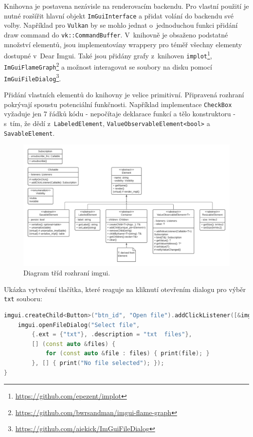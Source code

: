 Knihovna je postavena nezávisle na renderovacím backendu. Pro vlastní použití je nutné rozšířit hlavní objekt \texttt{ImGuiInterface} a přidat volání do backendu své volby. Například pro \texttt{Vulkan} by se mohlo jednat o~jednoduchou funkci přidání draw command do \texttt{vk::CommandBuffer}. V~knihovně je obsaženo podstatné množství elementů, jsou implementovány wrappery pro téměř všechny elementy dostupné v~Dear Imgui. Také jsou přidány grafy z~knihoven \texttt{implot}\footnote{\url{https://github.com/epezent/implot}}, \texttt{ImGuiFlameGraph}\footnote{\url{https://github.com/bwrsandman/imgui-flame-graph}} a možnost interagovat se soubory na disku pomocí \texttt{ImGuiFileDialog}\footnote{\url{https://github.com/aiekick/ImGuiFileDialog}}.

Přidání vlastních elementů do knihovny je velice primitivní. Připravená rozhraní pokrývají spoustu potenciální funkčnosti. Například implementace \texttt{CheckBox} vyžaduje jen 7 řádků kódu - nepočítaje deklarace funkcí a tělo konstruktoru - s~tím, že dědí z~\texttt{LabeledElement}, \texttt{ValueObservableElement<bool>} a \texttt{SavableElement}.

\begin{figure}[H]
	\centering
	\includegraphics[scale=0.5]{obrazky-figures/pfimgui_classes.pdf}
	\caption{Diagram tříd rozhraní imgui.}
	\label{fig:imgui_classes}
\end{figure}


Ukázka vytvoření tlačítka, které reaguje na kliknutí otevřením dialogu pro výběr \texttt{txt} souboru:

\begin{lstlisting}[language=C++, caption={Tvorba logického zařízení}]
imgui.createChild<Button>("btn_id", "Open file").addClickListener([&imgui] {
    imgui.openFileDialog("Select file", 
        {.ext = {"txt"}, .description = "txt  files"}, 
        [] (const auto &files) {
            for (const auto &file : files) { print(file); }
        }, [] { print("No file selected"); });
}
\end{lstlisting}


